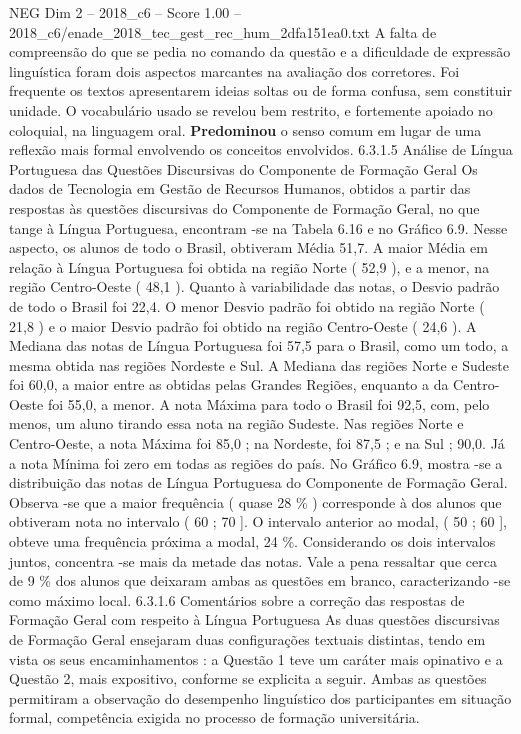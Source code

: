 \begin{textsample}{NEG Dim 2 – 2018\_c6 – Score 1.00 – 2018\_c6/enade\_2018\_tec\_gest\_rec\_hum\_2dfa151ea0.txt}
A falta de compreensão do que se pedia no comando da questão e a dificuldade de expressão linguística foram dois aspectos marcantes na avaliação dos corretores.
Foi frequente os textos apresentarem ideias soltas ou de forma confusa, sem constituir unidade.
O vocabulário usado se revelou bem restrito, e fortemente apoiado no coloquial, na linguagem oral. \textbf{Predominou} o senso comum em lugar de uma reflexão mais formal envolvendo os conceitos envolvidos. 6.3.1.5 Análise de Língua Portuguesa das Questões Discursivas do Componente de Formação Geral Os dados de Tecnologia em Gestão de Recursos Humanos, obtidos a partir das respostas às questões discursivas do Componente de Formação Geral, no que tange à Língua Portuguesa, encontram -se na Tabela 6.16 e no Gráfico 6.9.
Nesse aspecto, os alunos de todo o Brasil, obtiveram Média 51,7.
A maior Média em relação à Língua Portuguesa foi obtida na região Norte ( 52,9 ), e a menor, na região Centro-Oeste ( 48,1 ).
Quanto à variabilidade das notas, o Desvio padrão de todo o Brasil foi 22,4.
O menor Desvio padrão foi obtido na região Norte ( 21,8 ) e o maior Desvio padrão foi obtido na região Centro-Oeste ( 24,6 ).
A Mediana das notas de Língua Portuguesa foi 57,5 para o Brasil, como um todo, a mesma obtida nas regiões Nordeste e Sul.
A Mediana das regiões Norte e Sudeste foi 60,0, a maior entre as obtidas pelas Grandes Regiões, enquanto a da Centro-Oeste foi 55,0, a menor.
A nota Máxima para todo o Brasil foi 92,5, com, pelo menos, um aluno tirando essa nota na região Sudeste.
Nas regiões Norte e Centro-Oeste, a nota Máxima foi 85,0 ; na Nordeste, foi 87,5 ; e na Sul ; 90,0.
Já a nota Mínima foi zero em todas as regiões do país.
No Gráfico 6.9, mostra -se a distribuição das notas de Língua Portuguesa do Componente de Formação Geral.
Observa -se que a maior frequência ( quase 28 \% ) corresponde à dos alunos que obtiveram nota no intervalo ( 60 ; 70 ].
O intervalo anterior ao modal, ( 50 ; 60 ], obteve uma frequência próxima a modal, 24 \%.
Considerando os dois intervalos juntos, concentra -se mais da metade das notas.
Vale a pena ressaltar que cerca de 9 \% dos alunos que deixaram ambas as questões em branco, caracterizando -se como máximo local. 6.3.1.6 Comentários sobre a correção das respostas de Formação Geral com respeito à Língua Portuguesa As duas questões discursivas de Formação Geral ensejaram duas configurações textuais distintas, tendo em vista os seus encaminhamentos : a Questão 1 teve um caráter mais opinativo e a Questão 2, mais expositivo, conforme se explicita a seguir.
Ambas as questões permitiram a observação do desempenho linguístico dos participantes em situação formal, competência exigida no processo de formação universitária.

\end{textsample}
